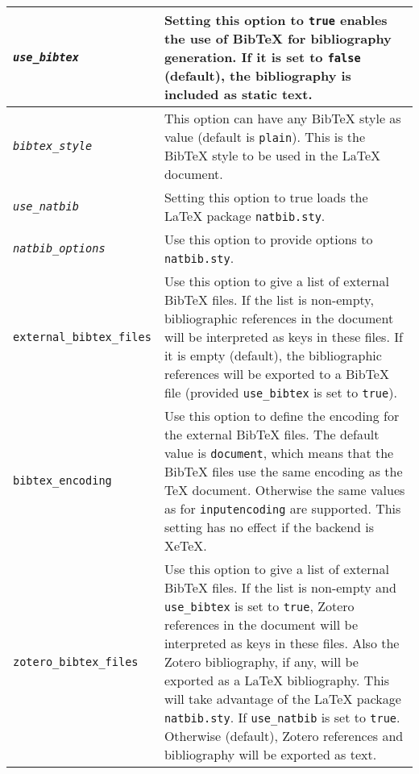 \documentclass{article}
\newcommand\textstyleSourceText[1]{\texttt{\textmd{#1}}}
\begin{document}
\begin{center}
\begin{tabular}{|l|l|}

\hline
\mdseries \textstyleSourceText{\emph{use\_bibtex}} & \mdseries Setting this option to \textstyleSourceText{true} enables the use of BibTeX for bibliography generation. If it is set to \textstyleSourceText{false} (default), the bibliography is included as static text.\\\hline
\mdseries \textstyleSourceText{\emph{bibtex\_style}} & \mdseries This option can have any BibTeX style as value (default is \textstyleSourceText{plain}). This is the BibTeX style to be used in the LaTeX document.\\\hline
\mdseries \textstyleSourceText{\emph{use\_natbib}} & \mdseries Setting this option to true loads the LaTeX package \textstyleSourceText{natbib.sty}.\\\hline
\mdseries \textstyleSourceText{\emph{natbib\_options}} & \mdseries Use this option to provide options to \textstyleSourceText{natbib.sty}.\\\hline
\mdseries \textstyleSourceText{external\_bibtex\_files} & \mdseries Use this option to give a list of external BibTeX files. If the list is non-empty, bibliographic references in the document will be interpreted as keys in these files. If it is empty (default), the bibliographic references will be exported to a BibTeX file (provided \textstyleSourceText{use\_bibtex} is set to \textstyleSourceText{true}).\\\hline
\textstyleSourceText{bibtex\_encoding} & Use this option to define the encoding for the external BibTeX files. The default value is \textstyleSourceText{document}, which means that the BibTeX files use the same encoding as the TeX document. Otherwise the same values as for \textstyleSourceText{inputencoding} are supported. This setting has no effect if the backend is XeTeX.\\\hline
\mdseries \textstyleSourceText{zotero\_bibtex\_files} & \mdseries Use this option to give a list of external BibTeX files. If the list is non-empty and \textstyleSourceText{use\_bibtex} is set to \textstyleSourceText{true}, Zotero references in the document will be interpreted as keys in these files. Also the Zotero bibliography, if any, will be exported as a LaTeX bibliography. This will take advantage of the LaTeX package \textstyleSourceText{natbib.sty}. If \textstyleSourceText{use\_natbib} is set to \textstyleSourceText{true}. Otherwise (default), Zotero references and bibliography will be exported as text.\\\hline

\end{tabular}
\end{center}
\end{document}
